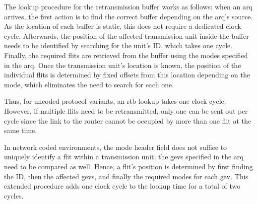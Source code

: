 The lookup procedure for the retransmission buffer works as follows: when an \gls{arq} arrives, the first action is to find the correct buffer
depending on the \gls{arq}'s source. As the location of each buffer is static, this does not require a dedicated clock cycle. Afterwards, the position
of the affected transmission unit inside the buffer needs to be identified by searching for the unit's ID, which takes one cycle. Finally, the
required flits are retrieved from the buffer using the modes specified in the \gls{arq}. Once the transmission unit's location is known, the position
of the individual flits is determined by fixed offsets from this location depending on the mode, which eliminates the need to search for each one.

Thus, for uncoded protocol variants, an \gls{rtb} lookup takes one clock cycle. However, if multiple flits need to be retransmitted, only one can be
sent out per cycle since the link to the router cannot be occupied by more than one flit at the same time.

In network coded environments, the mode header field does not suffice to uniquely identify a flit within a transmission unit; the \glspl{gev}
specified in the \gls{arq} need to be compared as well. Hence, a flit's position is determined by first finding the ID, then the affected \glspl{gev},
and finally the required modes for each \gls{gev}. This extended procedure adds one clock cycle to the lookup time for a total of two cycles.
